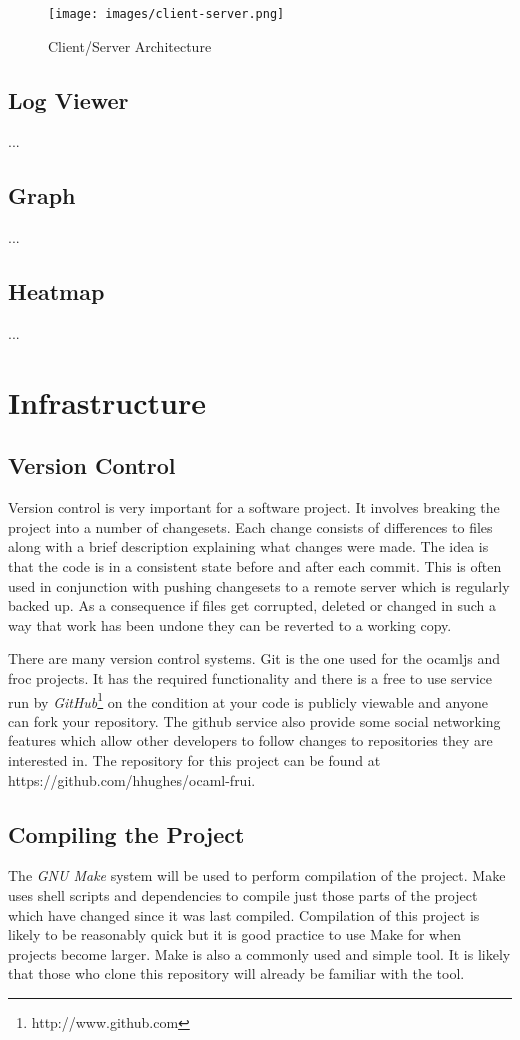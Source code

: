 \begin{figure}
  \texttt{[image: images/client-server.png]}
  \caption{Client/Server Architecture}
  \label{fig:client_server}
\end{figure}

\subsection{Log Viewer}
...

\subsection{Graph}
...

\subsection{Heatmap}
...

\section{Infrastructure}

\subsection{Version Control}
Version control is very important for a software project. It involves breaking the project into a number of changesets. Each change consists of differences to files along with a brief description explaining what changes were made. The idea is that the code is in a consistent state before and after each commit. This is often used in conjunction with pushing changesets to a remote server which is regularly backed up. As a consequence if files get corrupted, deleted or changed in such a way that work has been undone they can be reverted to a working copy.

There are many version control systems. Git is the one used for the ocamljs and froc projects. It has the required functionality and there is a free to use service run by \emph{GitHub}\footnote{http://www.github.com} on the condition at your code is publicly viewable and anyone can fork your repository. The github service also provide some social networking features which allow other developers to follow changes to repositories they are interested in. The repository for this project can be found at https://github.com/hhughes/ocaml-frui.

\subsection{Compiling the Project}
The \emph{GNU Make} system will be used to perform compilation of the project. Make uses shell scripts and dependencies to compile just those parts of the project which have changed since it was last compiled. Compilation of this project is likely to be reasonably quick but it is good practice to use Make for when projects become larger. Make is also a commonly used and simple tool. It is likely that those who clone this repository will already be familiar with the tool.

